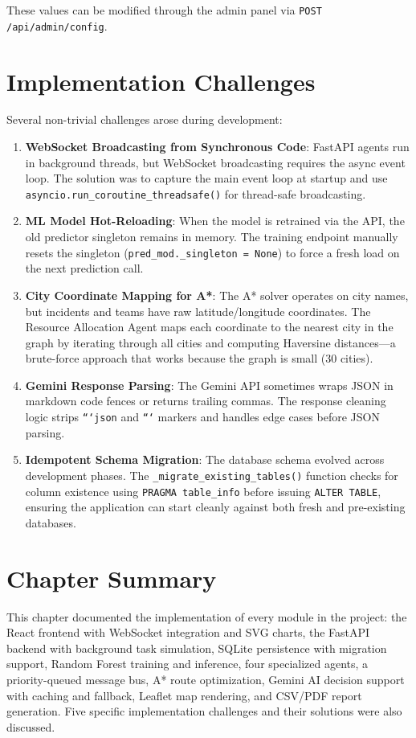 These values can be modified through the admin panel via \texttt{POST /api/admin/config}.

\section{Implementation Challenges}
\label{sec:impl_challenges}

Several non-trivial challenges arose during development:

\begin{enumerate}[leftmargin=*]
    \item \textbf{WebSocket Broadcasting from Synchronous Code}: FastAPI agents run in background threads, but WebSocket broadcasting requires the async event loop. The solution was to capture the main event loop at startup and use \texttt{asyncio.run\_coroutine\_threadsafe()} for thread-safe broadcasting.

    \item \textbf{ML Model Hot-Reloading}: When the model is retrained via the API, the old predictor singleton remains in memory. The training endpoint manually resets the singleton (\texttt{pred\_mod.\_singleton = None}) to force a fresh load on the next prediction call.

    \item \textbf{City Coordinate Mapping for A*}: The A* solver operates on city names, but incidents and teams have raw latitude/longitude coordinates. The Resource Allocation Agent maps each coordinate to the nearest city in the graph by iterating through all cities and computing Haversine distances---a brute-force approach that works because the graph is small (30 cities).

    \item \textbf{Gemini Response Parsing}: The Gemini API sometimes wraps JSON in markdown code fences or returns trailing commas. The response cleaning logic strips \texttt{```json} and \texttt{```} markers and handles edge cases before JSON parsing.

    \item \textbf{Idempotent Schema Migration}: The database schema evolved across development phases. The \texttt{\_migrate\_existing\_tables()} function checks for column existence using \texttt{PRAGMA table\_info} before issuing \texttt{ALTER TABLE}, ensuring the application can start cleanly against both fresh and pre-existing databases.
\end{enumerate}

\section{Chapter Summary}
\label{sec:ch6_summary}

This chapter documented the implementation of every module in the project: the React frontend with WebSocket integration and SVG charts, the FastAPI backend with background task simulation, SQLite persistence with migration support, Random Forest training and inference, four specialized agents, a priority-queued message bus, A* route optimization, Gemini AI decision support with caching and fallback, Leaflet map rendering, and CSV/PDF report generation. Five specific implementation challenges and their solutions were also discussed.
